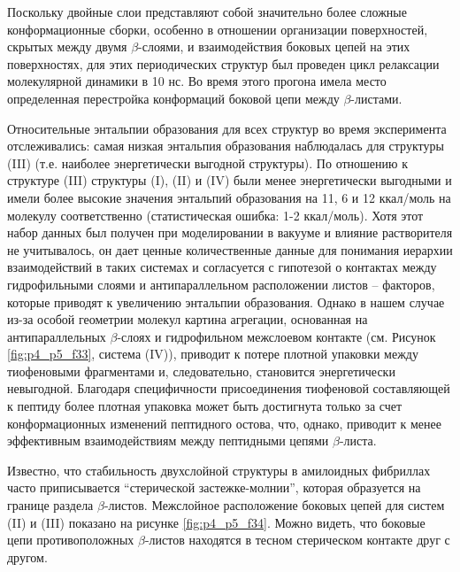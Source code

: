     Поскольку двойные слои представляют собой значительно более сложные конформационные сборки, особенно в отношении организации поверхностей, скрытых между двумя $\beta$-слоями, и взаимодействия боковых цепей на этих поверхностях, для этих периодических структур был проведен цикл релаксации молекулярной динамики в 10 нс. Во время этого прогона имела место определенная перестройка конформаций боковой цепи между $\beta$-листами.

    Относительные энтальпии образования для всех структур во время эксперимента отслеживались: самая низкая энтальпия образования наблюдалась для структуры (III) (т.е. наиболее энергетически выгодной структуры). По отношению к структуре (III) структуры (I), (II) и (IV) были менее энергетически выгодными и имели более высокие значения энтальпий образования на 11, 6 и 12 ккал/моль на молекулу соответственно (статистическая ошибка: 1-2 ккал/моль). Хотя этот набор данных был получен при моделировании в вакууме и влияние растворителя не учитывалось, он дает ценные количественные данные для понимания иерархии взаимодействий в таких системах и согласуется с гипотезой о контактах между гидрофильными слоями и антипараллельном расположении листов -- факторов, которые приводят к увеличению энтальпии образования. Однако в нашем случае из-за особой геометрии молекул картина агрегации, основанная на антипараллельных $\beta$-слоях и гидрофильном межслоевом контакте (см. Рисунок \ref{fig:p4_p5_f33}, система (IV)), приводит к потере плотной упаковки между тиофеновыми фрагментами и, следовательно, становится энергетически невыгодной. Благодаря специфичности присоединения тиофеновой составляющей к пептиду более плотная упаковка может быть достигнута только за счет конформационных изменений пептидного остова, что, однако, приводит к менее эффективным взаимодействиям между пептидными цепями $\beta$-листа.

    Известно, что стабильность двухслойной структуры в амилоидных фибриллах часто приписывается ``стерической застежке-молнии'', которая образуется на границе раздела $\beta$-листов. Межслойное расположение боковых цепей для систем (II) и (III) показано на рисунке \ref{fig:p4_p5_f34}. Можно видеть, что боковые цепи противоположных $\beta$-листов находятся в тесном стерическом контакте друг с другом.

